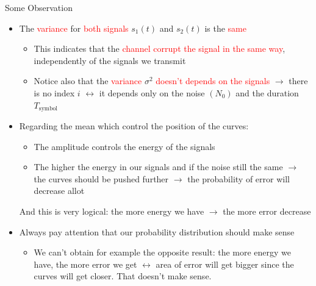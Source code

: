 \documentclass{Beamer}
\begin{document}
\begin{frame}[t,allowframebreaks]{Some Observation}

\begin{itemize}

\item The \textcolor{red}{variance} for \textcolor{red}{both signals} $s_1(t)$ and $s_2(t)$ is the \textcolor{red}{same}

	\begin{itemize}
	\item This indicates that the \textcolor{red}{channel corrupt the signal in the same way}, independently of the signals we transmit
	
	\item Notice also that the \textcolor{red}{variance} $\sigma^2$ \textcolor{red}{doesn't depends on the signals} $\rightarrow$ there is no index $i$ $\leftrightarrow$ it depends only on the noise $(N_0)$ and the duration $T_{\text{symbol}}$
	\end{itemize}

\item Regarding the mean which control the position of the curves:

	\begin{itemize}
	\item The amplitude controls the energy of the signals
	
	\item The higher the energy in our signals and if the noise still the same $\rightarrow$ the curves should be pushed further $\rightarrow$ the probability of error will decrease allot
	\end{itemize}
	
And this is very logical: the more energy we have $\rightarrow$ the more error decrease

\newpage
\item Always pay attention that our probability distribution should make sense

	\begin{itemize}
	\item We can't obtain for example the opposite result: the more energy we have, the more error we get $\leftrightarrow$ area of error will get bigger since the curves will get closer. That doesn't make sense.
	\end{itemize}

\end{itemize}

\end{frame}
\end{document}
